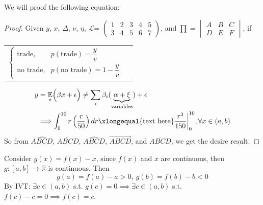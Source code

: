 \documentclass[11pt, letterpaper]{article}
\newcommand{\E}{\mathbb{E}}
\begin{document}
We will proof the following equation:
\begin{proof}

  Given $y$, $x$, $\Delta$, $\nu$, $\eta$, $\mathcal{L}$=
  $\begin{pmatrix}
  1 & 2 & 3 & 4 & 5 \\
  3 & 4 & 5 & 6 & 7
  \end{pmatrix}$,
  and $\prod=\begin{vmatrix}
  A &B  &C \\
  D&  E& F
  \end{vmatrix}$, if

  \begin{center}
    \begin{tabular}{ll}
      $\begin{cases}
      \text{trade}, & p(\text{trade})=\dfrac{y}{v}\\
      \text{no trade}, & p(\text{no trade})=1-\dfrac{y}{v}
      \end{cases}$\\
    \end{tabular}
  \end{center}

  \begin{align}
    \nonumber y&=\underset{\pi}{\E}\Big(\beta x + \epsilon\Big)\neq\sum\limits_{i}\beta_i(\underbrace{\alpha+\xi}_{\text{variables}}) + \epsilon\\
    &\Longrightarrow \int_{0}^{10}r \left( \dfrac{r}{50} \right)dr\xlongequal{\text{text here}}\dfrac{r^{3}}{150}\biggr\rvert^{10}_{0}, \forall x\in (a,b)
  \end{align}
  So from $\widehat{ABCD}$, $\widetilde{ABCD}$, $\widehat{ABCD}$, $\overrightarrow{ABCD}$, and $\overline{ABCD}$, we get the desire $\underline{\text{result}}$.
\end{proof}

\begin{framed}
  Consider $g(x)=f(x)-x$, since $f(x)$ and $x$ are continuous, then $g:[a,b]\to\mathbb{R}$ is continuous. Then
  $$g(a)=f(a)-a>0, \ g(b)=f(b)-b<0$$
  By IVT: $\exists c\in(a,b)$ s.t. $g(c)=0\implies \exists c\in(a,b)$ s.t. $f(c)-c=0\implies f(c)=c.$
\end{framed}
\end{document}
